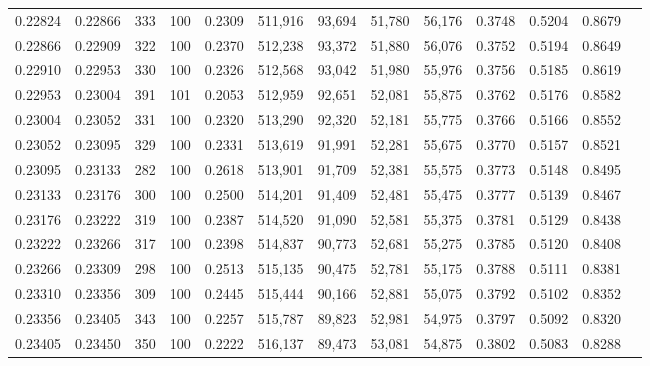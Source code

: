 \begin{tabular}{rrrrrrrrrrrrr}
0.22824 & 0.22866 &   333 & 100 &                                     0.2309 & 511,916 &  93,694 &  51,780 &  56,176 & 0.3748 & 0.5204 & 0.8679 \\
0.22866 & 0.22909 &   322 & 100 &                                     0.2370 & 512,238 &  93,372 &  51,880 &  56,076 & 0.3752 & 0.5194 & 0.8649 \\
0.22910 & 0.22953 &   330 & 100 &                                     0.2326 & 512,568 &  93,042 &  51,980 &  55,976 & 0.3756 & 0.5185 & 0.8619 \\
0.22953 & 0.23004 &   391 & 101 &                                     0.2053 & 512,959 &  92,651 &  52,081 &  55,875 & 0.3762 & 0.5176 & 0.8582 \\
0.23004 & 0.23052 &   331 & 100 &                                     0.2320 & 513,290 &  92,320 &  52,181 &  55,775 & 0.3766 & 0.5166 & 0.8552 \\
0.23052 & 0.23095 &   329 & 100 &                                     0.2331 & 513,619 &  91,991 &  52,281 &  55,675 & 0.3770 & 0.5157 & 0.8521 \\
0.23095 & 0.23133 &   282 & 100 &                                     0.2618 & 513,901 &  91,709 &  52,381 &  55,575 & 0.3773 & 0.5148 & 0.8495 \\
0.23133 & 0.23176 &   300 & 100 &                                     0.2500 & 514,201 &  91,409 &  52,481 &  55,475 & 0.3777 & 0.5139 & 0.8467 \\
0.23176 & 0.23222 &   319 & 100 &                                     0.2387 & 514,520 &  91,090 &  52,581 &  55,375 & 0.3781 & 0.5129 & 0.8438 \\
0.23222 & 0.23266 &   317 & 100 &                                     0.2398 & 514,837 &  90,773 &  52,681 &  55,275 & 0.3785 & 0.5120 & 0.8408 \\
0.23266 & 0.23309 &   298 & 100 &                                     0.2513 & 515,135 &  90,475 &  52,781 &  55,175 & 0.3788 & 0.5111 & 0.8381 \\
0.23310 & 0.23356 &   309 & 100 &                                     0.2445 & 515,444 &  90,166 &  52,881 &  55,075 & 0.3792 & 0.5102 & 0.8352 \\
0.23356 & 0.23405 &   343 & 100 &                                     0.2257 & 515,787 &  89,823 &  52,981 &  54,975 & 0.3797 & 0.5092 & 0.8320 \\
0.23405 & 0.23450 &   350 & 100 &                                     0.2222 & 516,137 &  89,473 &  53,081 &  54,875 & 0.3802 & 0.5083 & 0.8288 \\

\end{tabular}
